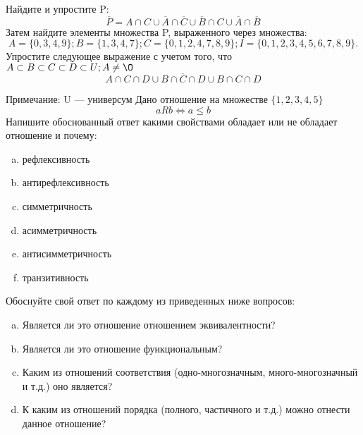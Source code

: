 \documentclass[10pt]{exam}
\begin{document}
\begin{questions}
\question
Найдите и упростите P:
\begin{equation*}
\overline{P} = A \cap C \cup \overline{A} \cap \overline{C} \cup \overline{B} \cap C \cup \overline{A} \cap \overline{B}
\end{equation*}
Затем найдите элементы множества P, выраженного через множества:
\begin{equation*}
A = \{0, 3, 4, 9\}; 
B = \{1, 3, 4, 7\};
C = \{0, 1, 2, 4, 7, 8, 9\};
I = \{0, 1, 2, 3, 4, 5, 6, 7, 8, 9\}.
\end{equation*}\question
Упростите следующее выражение с учетом того, что $A\subset B \subset C \subset D \subset U; A \neq \O$
\begin{equation*}
A \cap C  \cap D \cup B \cap \overline{C} \cap D \cup B \cap C \cap D
\end{equation*}

Примечание: U — универсум\question
Дано отношение на множестве $\{1, 2, 3, 4, 5\}$ 
\begin{equation*}
aRb \iff a \leq b
\end{equation*}
Напишите обоснованный ответ какими свойствами обладает или не обладает отношение и почему:   
\begin{enumerate} [a)]\setcounter{enumi}{0}
\item рефлексивность
\item антирефлексивность
\item симметричность
\item асимметричность
\item антисимметричность
\item транзитивность
\end{enumerate}

Обоснуйте свой ответ по каждому из приведенных ниже вопросов:
\begin{enumerate} [a)]\setcounter{enumi}{0}
    \item Является ли это отношение отношением эквивалентности?
    \item Является ли это отношение функциональным?
    \item Каким из отношений соответствия (одно-многозначным, много-многозначный и т.д.) оно является?
    \item К каким из отношений порядка (полного, частичного и т.д.) можно отнести данное отношение?
\end{enumerate}



\end{questions}
\end{document}
